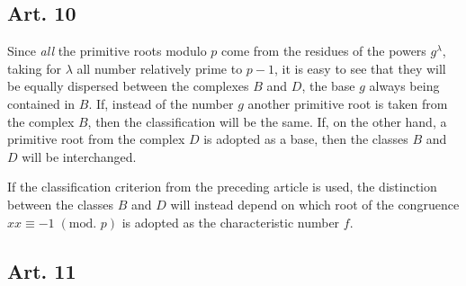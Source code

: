 \documentclass{book}
\theoremstyle{plain}
\theoremstyle{remark}
\begin{document}
\subsection*{Art. 10} 

Since \textit{all} the primitive roots modulo $p$ come from the residues of the powers $g^{\lambda}$, taking for $\lambda$ all number relatively prime to $p-1$, it is easy to see that they will be equally dispersed between the complexes $B$ and $D$, the base $g$ always being contained in $B$.  If, instead of the number $g$ another primitive root is taken from the complex $B$, then the classification will be the same.  If, on the other hand, a primitive root from the complex $D$ is adopted as a base, then the classes $B$ and $D$ will be interchanged.  

If the classification criterion from the preceding article is used, the distinction between the classes $B$ and $D$ will instead depend on which root of the congruence $xx \equiv -1 \;(\textrm{mod. }p)$ is adopted as the characteristic number $f$. 

\subsection*{Art. 11} 
\end{document}
